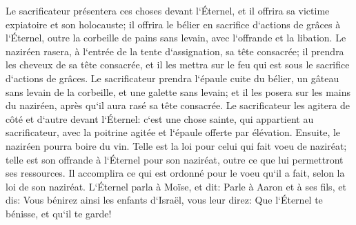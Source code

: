\verse Le sacrificateur présentera ces choses devant l`Éternel, et il offrira sa victime expiatoire et son holocauste; 
\verse il offrira le bélier en sacrifice d`actions de grâces à l`Éternel, outre la corbeille de pains sans levain, avec l`offrande et la libation. 
\verse Le naziréen rasera, à l`entrée de la tente d`assignation, sa tête consacrée; il prendra les cheveux de sa tête consacrée, et il les mettra sur le feu qui est sous le sacrifice d`actions de grâces. 
\verse Le sacrificateur prendra l`épaule cuite du bélier, un gâteau sans levain de la corbeille, et une galette sans levain; et il les posera sur les mains du naziréen, après qu`il aura rasé sa tête consacrée. 
\verse Le sacrificateur les agitera de côté et d`autre devant l`Éternel: c`est une chose sainte, qui appartient au sacrificateur, avec la poitrine agitée et l`épaule offerte par élévation. Ensuite, le naziréen pourra boire du vin. 
\verse Telle est la loi pour celui qui fait voeu de naziréat; telle est son offrande à l`Éternel pour son naziréat, outre ce que lui permettront ses ressources. Il accomplira ce qui est ordonné pour le voeu qu`il a fait, selon la loi de son naziréat. 
\verse L`Éternel parla à Moïse, et dit: 
\verse Parle à Aaron et à ses fils, et dis: Vous bénirez ainsi les enfants d`Israël, vous leur direz: 
\verse Que l`Éternel te bénisse, et qu`il te garde! 
